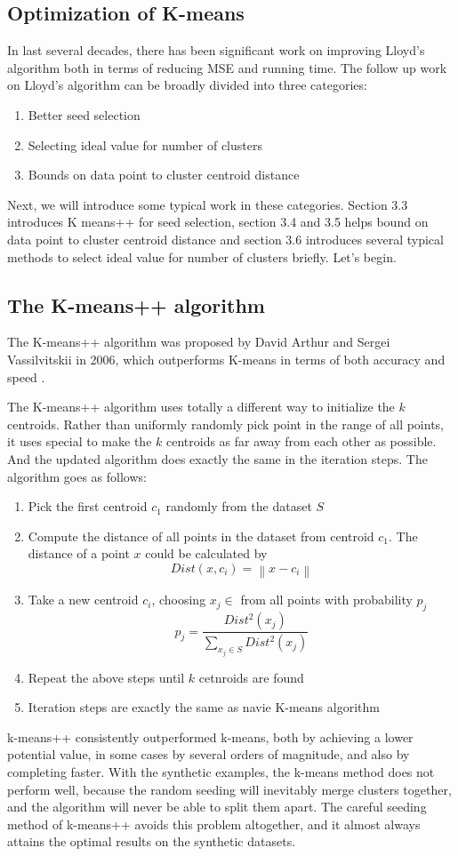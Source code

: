 \documentclass[11pt]{article}
\begin{document}
\subsection{Optimization of K-means}
In last several decades, there has been significant work on improving Lloyd’s algorithm both in terms of reducing MSE and running time. The follow up
work on Lloyd’s algorithm can be broadly divided into three categories:
\begin{enumerate}
\item Better seed selection
\item Selecting ideal value for number of clusters
\item Bounds on data point to cluster centroid distance
\end{enumerate}
Next, we will introduce some typical work in these categories. Section 3.3 introduces K means++ for seed selection, section 3.4 and 3.5 helps bound on data point to cluster centroid distance and section 3.6 introduces several typical methods to select ideal value for number of clusters briefly. Let's begin.


\subsection{The K-means++ algorithm}
The K-means++ algorithm was proposed by David Arthur and Sergei Vassilvitskii in 2006, which outperforms K-means in terms of both accuracy and speed \cite{kmeanspp}.
\par The K-means++ algorithm uses totally a different way to initialize the $k$ centroids. Rather than uniformly randomly pick point in the range of all points, it uses special to make the $k$ centroids as far away from each other as possible.
And the updated algorithm does exactly the same in the iteration steps. The algorithm goes as follows:
\begin{enumerate}
  \item Pick the first centroid $c_1$ randomly from the dataset $S$
  \item Compute the distance of all points in the dataset from centroid $c_1$. The distance of a point $x$ could be calculated by $$ Dist(x, c_i) = {\left\lVert x-c_i\right\rVert } $$
  \item Take a new centroid $c_i$, choosing $x_j \in $ from all points with probability $p_j$ $$p_j = \frac{Dist^2(x_j)}{\sum_{x_j \in S} Dist^2(x_j)} $$
  \item Repeat the above steps until $k$ cetnroids are found
  \item Iteration steps are exactly the same as navie K-means algorithm
\end{enumerate}
\par k-means++ consistently outperformed k-means, both by achieving a lower potential value,
in some cases by several orders of magnitude, and also by completing faster. With the synthetic
examples, the k-means method does not perform well, because the random seeding will inevitably
merge clusters together, and the algorithm will never be able to split them apart. The careful
seeding method of k-means++ avoids this problem altogether, and it almost always attains the
optimal results on the synthetic datasets.\cite{kmeanspp}
\end{document}
